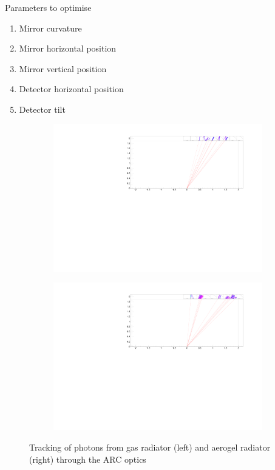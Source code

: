 \documentclass{beamer}
\begin{document}
\begin{frame}{Parameters to optimise}
  \begin{enumerate}
    \setlength\itemsep{0.2em}
    \item{Mirror curvature}
    \item{Mirror horizontal position}    
    \item{Mirror vertical position}
    \item{Detector horizontal position}
    \item{Detector tilt}
  \end{enumerate}
  \vspace{-0.2cm}
  \begin{figure}
    \centering
    \begin{subfigure}{0.45\textwidth}
      \includegraphics[width = 1.0\textwidth, trim = {11cm 5cm 3.5cm 0.5cm}, clip = true]{Plots/EventDisplay_MainRow.pdf}
    \end{subfigure}%
    \hspace{0.2cm}
    \begin{subfigure}{0.45\textwidth}
      \includegraphics[width = 1.0\textwidth, trim = {11.6cm 5cm 2.9cm 0.5cm}, clip = true]{Plots/EventDisplay_MainRow_Aerogel.pdf}
    \end{subfigure}
    \caption{Tracking of photons from gas radiator (left) and aerogel radiator (right) through the ARC optics}
  \end{figure}
\end{frame}
\end{document}
